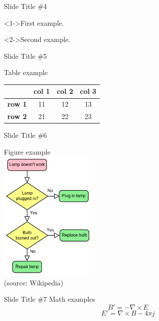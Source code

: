 \documentclass{beamer}
\begin{document}
\begin{frame}{Slide Title \#4}
	\begin{example}
		<1->First example. 
	\end{example}
	\begin{example}
		<2->Second example.
	\end{example}
\end{frame}

\begin{frame}{Slide Title \#5}
	\begin{center}
		Table example \\[12pt]
		\begin{tabular}{c||c|c|c|}
			& \textbf{col 1} & \textbf{col  2} & \textbf{col 3} \\
			\hline
			\hline
			\textbf{row 1} & 11 & 12 & 13 \\
			\hline
			\textbf{row 2} & 21 & 22 & 23 \\
		\end{tabular}
    \end{center}
\end{frame}

\begin{frame}{Slide Title \#6}
	\begin{center}
		Figure example \\[12pt]
		\includegraphics[width=0.35\textwidth,keepaspectratio]{LampFlowchart.png}
		\\
		\footnotesize(source: \textlatin{Wikipedia})
    \end{center}
\end{frame}

\begin{frame}{Slide Title \#7}
	\centering
	Math examples \\[12pt]
	\begin{equation}
        	B'=-\nabla \times E
	\end{equation}
	\begin{equation*}
        	E'=\nabla \times B - 4\pi j
	\end{equation*}
\end{frame}
\end{document}
